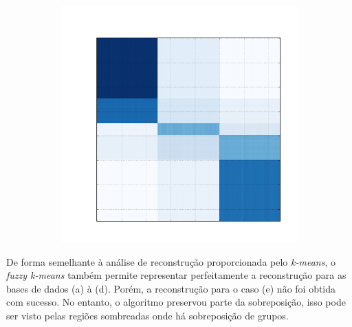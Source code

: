 \documentclass[
    12pt,                %
    oneside,            %
    a4paper,            %
    english,            %
    brazil                %
    ]{abntex2ppgsi}
\begin{document}
\begin{figure}[H]
\begin{subfigure}[b]{0.18\textwidth}
        \caption{}
    \end{subfigure}
    \begin{subfigure}[b]{0.18\textwidth}
        \includegraphics[width=\textwidth]{img/e-reconstruction-fkmeans.png}
        \caption{}
    \end{subfigure}
    \label{fig:reconstruction:fkmeans}
        \label{fig:reconstruction:kmeans}
\end{figure}



De forma semelhante à análise de reconstrução proporcionada pelo \textit{k-means}, o \textit{fuzzy k-means} também permite representar perfeitamente a reconstrução para as bases de dados (a) à (d).
Porém, a reconstrução para o caso (e) não foi obtida com sucesso.
No entanto, o algoritmo preservou parte da sobreposição, isso pode ser visto pelas regiões sombreadas onde há sobreposição de grupos.
\end{document}
